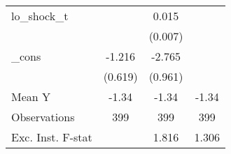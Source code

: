 {\begin{tabular}{l*{3}{c}}
\addlinespace
lo\_shock\_t  &                     &       0.015\sym{*}  &                     \\
            &                     &     (0.007)         &                     \\
\addlinespace
\_cons      &      -1.216\sym{*}  &      -2.765\sym{***}&                     \\
            &     (0.619)         &     (0.961)         &                     \\
\midrule
Mean Y      &       -1.34         &       -1.34         &       -1.34         \\
Observations&         399         &         399         &         399         \\
Exc. Inst. F-stat&                     &       1.816         &       1.306         \\
\bottomrule
\end{tabular}
}
